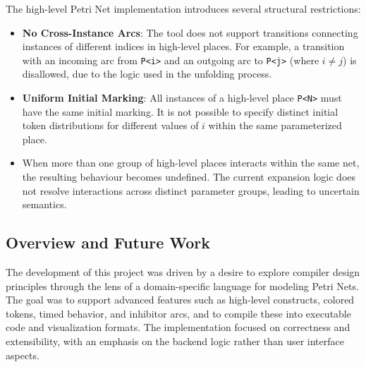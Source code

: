 \documentclass[12pt]{article}
\begin{document}
        The high-level Petri Net implementation introduces several structural restrictions:

        \begin{itemize}
            \item \textbf{No Cross-Instance Arcs}: The tool does not support transitions connecting instances of different indices in high-level places. For example, a transition with an incoming arc from \texttt{P<i>} and an outgoing arc to \texttt{P<j>} (where $i \ne j$) is disallowed, due to the logic used in the unfolding process.
            \item \textbf{Uniform Initial Marking}: All instances of a high-level place \texttt{P<N>} must have the same initial marking. It is not possible to specify distinct initial token distributions for different values of $i$ within the same parameterized place.
            \item When more than one group of high-level places interacts within the same net, the resulting behaviour becomes undefined. The current expansion logic does not resolve interactions across distinct parameter groups, leading to uncertain semantics.
        \end{itemize}



\subsection*{Overview and Future Work}
The development of this project was driven by a desire to explore compiler design principles through the lens of a domain-specific language for modeling Petri Nets. The goal was to support advanced features such as high-level constructs, colored tokens, timed behavior, and inhibitor arcs, and to compile these into executable code and visualization formats. The implementation focused on correctness and extensibility, with an emphasis on the backend logic rather than user interface aspects.
\end{document}

